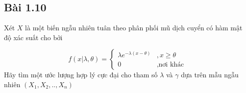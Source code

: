 \subsection{Bài 1.10}

\begin{problem}{1.10}
Xét $X$ là một biến ngẫu nhiên tuân theo phân phối mũ dịch cuyển có hàm mật độ xác suất cho bởi

\begin{equation} 
f\left(\left.x\right|\lambda,\theta\right) = \begin{cases} \lambda e^{-\lambda\left(x-\theta\right)} & , x\geq\theta\\0 &, \textrm{nơi khác} \end{cases} 
\end{equation} 
Hãy tìm một ước lượng hợp lý cực đại cho tham số $\lambda$ và $\gamma$ dựa trên mẫu ngẫu nhiên $\left(X_1,X_2,..,X_n\right)$
\end{problem}

